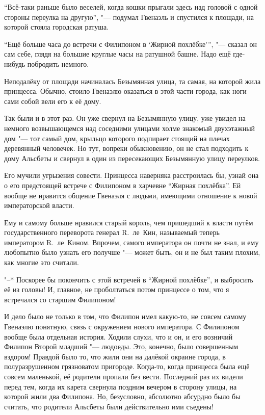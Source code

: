 \enquote{Всё-таки раньше было веселей, когда кошки прыгали здесь над головой с одной
стороны переулка на другую}, "--- подумал Гвенаэль и спустился к площади, на
которой стояла городская ратуша.

\enquote{Ещё больше часа до встречи с Филипоном в \enquote{Жирной похлёбке}},
"--- сказал он сам себе, глядя на большие круглые часы на ратушной башне.
Надо ещё где-нибудь побродить немного.

Неподалёку от площади начиналась Безымянная улица, та самая, на которой жила
принцесса.
Обычно, стоило Гвенаэлю оказаться в этой части города, как ноги сами собой вели
его к её дому.

Так были и в этот раз.
Он уже свернул на Безымянную улицу, уже увидел на немного возвышающемся над
соседними улицами холме знакомый двухэтажный дом "--- тот самый дом, крыльцо
которого подпирает стоящий на плечах деревянный человечек.
Но тут, вопреки обыкновению, он не стал подходить к дому Альсбеты и свернул в
один из пересекающих Безымянную улицу переулков.

Его мучили угрызения совести.
Принцесса наверняка расстроилась бы, узнай она о его предстоящей встрече с
Филипоном в харчевне \enquote{Жирная похлёбка}.
Ей вообще не нравится общение Гвенаэля с людьми, имеющими отношение к новой
императорской власти.

Ему и самому больше нравился старый король, чем пришедший к власти путём
государственного переворота генерал R.~ле~Кин, называемый теперь императором
R.~ле~Кином.
Впрочем, самого императора он почти не знал, и ему любопытно было узнать его
получше "--- может быть, он и не был таким плохим, как многие это считали.

"--* Поскорее бы покончить с этой встречей в \enquote{Жирной похлёбке}, и
выбросить её из головы!
И, главное, не проболтаться потом принцессе о том, что я встречался со старшим
Филипоном!

И дело было не только в том, что Филипон имел какую-то, не совсем самому
Гвенаэлю понятную, связь с окружением нового императора.
С Филипоном вообще была отдельная история.
Ходили слухи, что и он, и его возничий Филипон Второй младший "--- людоеды.
Это, конечно, было совершенным вздором!
Правдой было то, что жили они на далёкой окраине города, в полуразрушенном
грязноватом пригороде.
Когда-то, когда принцесса была ещё совсем маленькой, её родители пропали без
вести.
Последний раз их видели перед тем, когда их карета свернула поздним вечером в
сторону улицы, на которой жили два Филипона.
Но, безусловно, абсолютно абсурдно было бы считать, что родители Альсбеты были
действительно ими съедены!

